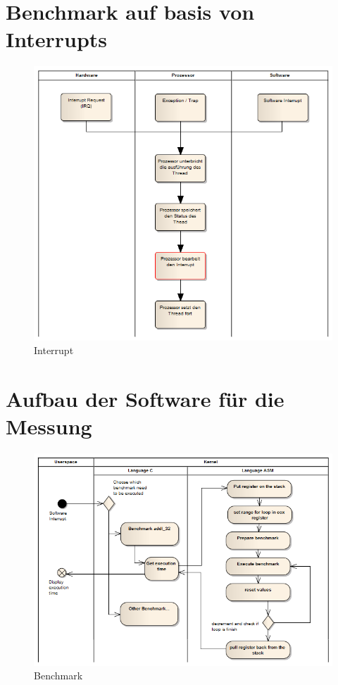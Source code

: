 
\section{Benchmark auf basis von Interrupts}


\begin{figure}[h]
\centering
\includegraphics[scale=0.5]{images/interrupt_ea.png}
\caption{Interrupt}
\label{fig:Interrupt}
\end{figure}

\section{Aufbau der Software für die Messung}


\begin{figure}[h]
\centering
\includegraphics[scale=0.5]{images/benchmark_ea.png}
\caption{Benchmark}
\label{fig:Benchmark}
\end{figure}


